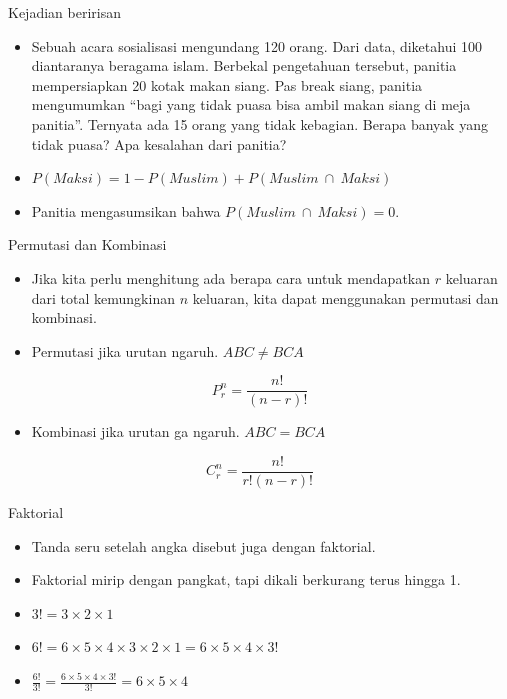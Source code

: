 \documentclass[
  ignorenonframetext,
]{beamer}
\providecommand{\tightlist}{%
  \setlength{\itemsep}{0pt}\setlength{\parskip}{0pt}}\usepackage{longtable,booktabs,array}
\begin{document}
\begin{frame}{Kejadian beririsan}
\label{kejadian-beririsan-3}
\begin{itemize}[<+->]
\item
  Sebuah acara sosialisasi mengundang 120 orang. Dari data, diketahui
  100 diantaranya beragama islam. Berbekal pengetahuan tersebut, panitia
  mempersiapkan 20 kotak makan siang. Pas break siang, panitia
  mengumumkan ``bagi yang tidak puasa bisa ambil makan siang di meja
  panitia''. Ternyata ada 15 orang yang tidak kebagian. Berapa banyak
  yang tidak puasa? Apa kesalahan dari panitia?
\item
  \(P(Maksi)=1-P(Muslim)+P(Muslim \ \cap \ Maksi)\)
\item
  Panitia mengasumsikan bahwa \(P(Muslim \ \cap \ Maksi) = 0\).
\end{itemize}
\end{frame}

\begin{frame}{Permutasi dan Kombinasi}
\label{permutasi-dan-kombinasi}
\begin{itemize}
\item
  Jika kita perlu menghitung ada berapa cara untuk mendapatkan \(r\)
  keluaran dari total kemungkinan \(n\) keluaran, kita dapat menggunakan
  permutasi dan kombinasi.
\item
  Permutasi jika urutan ngaruh. \(ABC \neq BCA\)
\end{itemize}

\[
P^n_r=\frac{n!}{(n-r)!}
\]

\begin{itemize}
\tightlist
\item
  Kombinasi jika urutan ga ngaruh. \(ABC=BCA\)
\end{itemize}

\[
C^n_r=\frac{n!}{r!(n-r)!}
\]
\end{frame}

\begin{frame}{Faktorial}
\label{faktorial}
\begin{itemize}
\item
  Tanda seru setelah angka disebut juga dengan faktorial.
\item
  Faktorial mirip dengan pangkat, tapi dikali berkurang terus hingga 1.
\item
  \(3!=3\times 2\times 1\)
\item
  \(6!=6\times 5\times 4 \times 3 \times 2 \times 1=6 \times 5 \times 4 \times 3!\)
\item
  \(\frac{6!}{3!}=\frac{6 \times 5 \times 4 \times 3!}{3!}=6 \times 5 \times 4\)
\end{itemize}
\end{frame}
\end{document}
